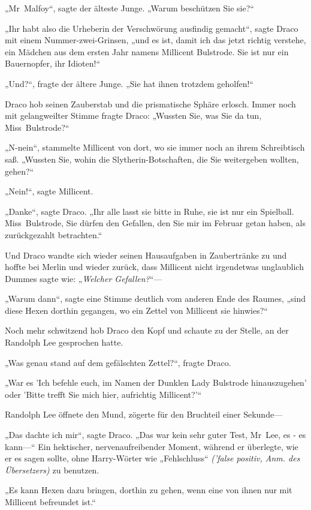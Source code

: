 {„Mr~Malfoy“, sagte der älteste Junge. „Warum beschützen Sie sie?“

„Ihr habt also die Urheberin der Verschwörung ausfindig gemacht“, sagte Draco mit einem Nummer-zwei-Grinsen, „und es ist, damit ich das jetzt richtig verstehe, ein Mädchen aus dem ersten Jahr namens Millicent Bulstrode. Sie ist nur ein Bauernopfer, ihr Idioten!“

„Und?“, fragte der ältere Junge. „Sie hat ihnen trotzdem geholfen!“

Draco hob seinen Zauberstab und die prismatische Sphäre erlosch. Immer noch mit gelangweilter Stimme fragte Draco: „Wussten Sie, was Sie da tun, Miss~Bulstrode?“

„N-nein“, stammelte Millicent von dort, wo sie immer noch an ihrem Schreibtisch saß. „Wussten Sie, wohin die Slytherin-Botschaften, die Sie weitergeben wollten, gehen?“

„Nein!“, sagte Millicent.

„Danke“, sagte Draco. „Ihr alle lasst sie bitte in Ruhe, sie ist nur ein Spielball. Miss~Bulstrode, Sie dürfen den Gefallen, den Sie mir im Februar getan haben, als zurückgezahlt betrachten.“

Und Draco wandte sich wieder seinen Hausaufgaben in Zaubertränke zu und hoffte bei Merlin und wieder zurück, dass Millicent nicht irgendetwas unglaublich Dummes sagte wie: „\emph{Welcher Gefallen?}“—

„Warum dann“, sagte eine Stimme deutlich vom anderen Ende des Raumes, „sind diese Hexen dorthin gegangen, wo ein Zettel von Millicent sie hinwies?“

Noch mehr schwitzend hob Draco den Kopf und schaute zu der Stelle, an der Randolph Lee gesprochen hatte.

„Was genau stand auf dem gefälschten Zettel?“, fragte Draco.

„War es 'Ich befehle euch, im Namen der Dunklen Lady Bulstrode hinauszugehen' oder 'Bitte trefft Sie mich hier, aufrichtig Millicent?'“

Randolph Lee öffnete den Mund, zögerte für den Bruchteil einer Sekunde—

„Das dachte ich mir“, sagte Draco. „Das war kein sehr guter Test, Mr~Lee, es - es kann—“ Ein hektischer, nervenaufreibender Moment, während er überlegte, wie er es sagen sollte, ohne Harry-Wörter wie „Fehlschluss“ \emph{('false positiv, Anm. des Übersetzers)} zu benutzen.

„Es kann Hexen dazu bringen, dorthin zu gehen, wenn eine von ihnen nur mit Millicent befreundet ist.“

}
